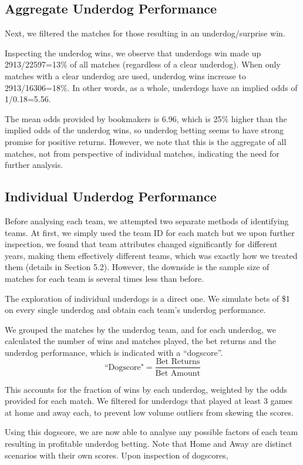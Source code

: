 \documentclass[12pt, a4paper]{article}
\begin{document}
\subsection{Aggregate Underdog Performance}
Next, we filtered the matches for those resulting in an underdog/surprise win.

Inspecting the underdog wins, we observe that underdogs win made up  2913/22597=13$\%$ of all matches (regardless of a clear underdog). 
When only matches with a clear underdog are used, underdog wins increase to 2913/16306=18$\%$. In other words, as a whole, underdogs have an implied odds of 1/0.18=5.56. 

The mean odds provided by bookmakers is 6.96, which is 25$\%$ higher than the implied odds of the underdog wins, so underdog betting seems to have strong promise for positive returns. However, we note that this is the aggregate of all matches, not from perspective of individual matches, indicating the need for further analysis.

\subsection{Individual Underdog Performance}
Before analysing each team, we attempted two separate methods of identifying teams. At first, we simply used the team ID for each match but we upon further inspection, we found that team attributes changed significantly for different years, making them effectively different teams, which was exactly how we treated them (details in Section 5.2). However, the downside is the sample size of matches for each team is several times less than before.

The exploration of individual underdogs is a direct one. We simulate bets of \$1 on every single underdog and obtain each team’s underdog performance. 

We grouped the matches by the underdog team, and for each underdog, we calculated the number of wins and matches played, the bet returns and the underdog performance, which is indicated with a “dogscore”.
$$\text{``Dogscore"} = \frac{\text{Bet Returns}}{\text{Bet Amount}}$$

This accounts for the fraction of wins by each underdog, weighted by the odds provided for each match. We filtered for underdogs that played at least 3 games at home and away each, to prevent low volume outliers from skewing the scores.

Using this dogscore, we are now able to analyse any possible factors of each team resulting in profitable underdog betting. Note that Home and Away are distinct scenarios with their own scores. Upon inspection of dogscores,
\end{document}

